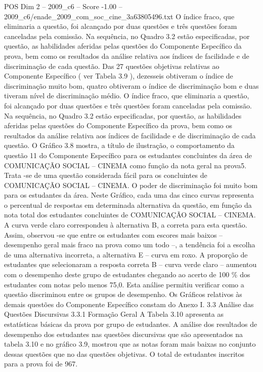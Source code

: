 \begin{textsample}{POS Dim 2 – 2009\_c6 – Score -1.00 – 2009\_c6/enade\_2009\_com\_soc\_cine\_3a63805496.txt}
O índice fraco, que eliminaria a questão, foi alcançado por duas questões e três questões foram canceladas pela comissão.
Na sequência, no Quadro 3.2 estão especificadas, por questão, as habilidades aferidas pelas questões do Componente Específico da prova, bem como os resultados da análise relativa aos índices de facilidade e de discriminação de cada questão.
Das 27 questões objetivas relativas ao Componente Específico ( ver Tabela 3.9 ), dezesseis obtiveram o índice de discriminação muito bom, quatro obtiveram o índice de discriminação bom e duas tiveram nível de discriminação médio.
O índice fraco, que eliminaria a questão, foi alcançado por duas questões e três questões foram canceladas pela comissão.
Na sequência, no Quadro 3.2 estão especificadas, por questão, as habilidades aferidas pelas questões do Componente Específico da prova, bem como os resultados da análise relativa aos índices de facilidade e de discriminação de cada questão.
O Gráfico 3.8 mostra, a título de ilustração, o comportamento da questão 11 do Componente Específico para os estudantes concluintes da área de COMUNICAÇÃO SOCIAL – CINEMA como função da nota geral na prova5.
Trata -se de uma questão considerada fácil para os concluintes de COMUNICAÇÃO SOCIAL – CINEMA.
O poder de discriminação foi muito bom para os estudantes da área.
Neste Gráfico, cada uma das cinco curvas representa o percentual de respostas em determinada alternativa da questão, em função da nota total dos estudantes concluintes de COMUNICAÇÃO SOCIAL – CINEMA.
A curva verde claro correspondeu à alternativa B, a correta para esta questão.
Assim, observou -se que entre os estudantes com escores mais baixos – desempenho geral mais fraco na prova como um todo –, a tendência foi a escolha de uma alternativa incorreta, a alternativa E – curva em roxo.
A proporção de estudantes que selecionaram a resposta correta B – curva verde claro – aumentou com o desempenho deste grupo de estudantes chegando ao acerto de 100 \% dos estudantes com notas pelo menos 75,0.
Esta análise permitiu verificar como a questão discriminou entre os grupos de desempenho.
Os Gráficos relativos às demais questões do Componente Específico constam do Anexo I. 3.3 Análise das Questões Discursivas 3.3.1 Formação Geral A Tabela 3.10 apresenta as estatísticas básicas da prova por grupo de estudantes.
A análise dos resultados de desempenho dos estudantes nas questões discursivas que são apresentados na tabela 3.10 e no gráfico 3.9, mostrou que as notas foram mais baixas no conjunto dessas questões que no das questões objetivas.
O total de estudantes inscritos para a prova foi de 967.

\end{textsample}
